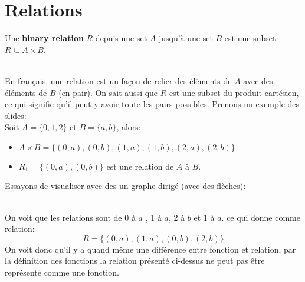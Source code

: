 \section{Relations}

\begin{definition}
    Une \textbf{binary relation} $R$ depuis une set $A$ jusqu'à une set $B$ est une subset: $R \subseteq A \times B$.
\end{definition}
\\
En français, une relation est un façon de relier des éléments de $A$ avec des éléments de $B$ (en pair). On sait aussi que $R$ est une subset du produit cartésien, ce qui signifie qu'il peut y avoir toute les pairs possibles. Prenons un exemple des slides:
\\
Soit $A = \{0, 1, 2\}$ et $B = \{a, b\}$, alors:
\begin{itemize}
    \item $A \times B = \{(0, a), (0, b), (1, a), (1, b), (2, a), (2, b)\}$
    \item $R_1 = \{(0, a), (0, b)\}$ est une relation de $A$ à $B$.
\end{itemize}

Essayons de visualiser avec des un graphe dirigé (avec des flèches):
\begin{center}
\end{center}
\\

On voit que les relations sont de $0$ à $a$ , 1 à $a$, 2 à $b$ et $1$ à $a$. ce qui donne comme relation:
\[ R =\{(0, a), (1, a), (0, b), (2, b)\}\]
On voit donc qu'il y a quand même une différence entre fonction et relation, par la définition des fonctions la relation présenté ci-dessus ne peut pas être représenté comme une fonction.

